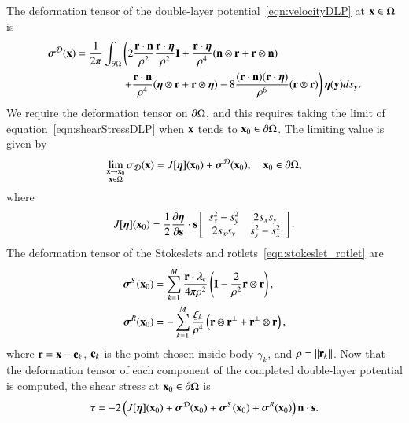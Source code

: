 \documentclass[preprint, 10pt]{elsarticle}
\begin{document}
The deformation tensor of the double-layer
potential~\eqref{eqn:velocityDLP} at ${\mathbf{x}} \in \Omega$ is
\begin{equation}
  \label{eqn:shearStressDLP}
  \begin{aligned}
  {\boldsymbol\sigma}^{\mathcal{D}}({\mathbf{x}}) = \frac{1}{2\pi}\int_{{\partial}\Omega} &\left(
    2\frac{{\mathbf{r}} \cdot {\mathbf{n}}}{\rho^2} \frac{{\mathbf{r}} \cdot {\boldsymbol\eta}}{\rho^2} {\mathbf{I}} + 
    \frac{{\mathbf{r}} \cdot {\boldsymbol\eta}}{\rho^4} ({\mathbf{n}} \otimes {\mathbf{r}} + {\mathbf{r}} \otimes {\mathbf{n}}) 
    \right. \\
    &\left.
    +\frac{{\mathbf{r}} \cdot {\mathbf{n}}}{\rho^4} ({\boldsymbol\eta} \otimes {\mathbf{r}} + {\mathbf{r}} \otimes {\boldsymbol\eta}) - 
    8\frac{({\mathbf{r}} \cdot {\mathbf{n}})({\mathbf{r}} \cdot {\boldsymbol\eta})}{\rho^6}({\mathbf{r}} \otimes {\mathbf{r}})
  \right) {\boldsymbol\eta}({\mathbf{y}}) ds_{\mathbf{y}}.
  \end{aligned}
\end{equation}
We require the deformation tensor on ${\partial}\Omega$, and this requires
taking the limit of equation~\eqref{eqn:shearStressDLP} when ${\mathbf{x}}$ tends
to ${\mathbf{x}}_0 \in {\partial}\Omega$.  The limiting value is given
by~\cite{qua-bir2014a}
\begin{align*}
  \lim_{\substack{{\mathbf{x}} \rightarrow {\mathbf{x}}_0 \\ {\mathbf{x}} \in \Omega}}\sigma_{\mathcal{D}}({\mathbf{x}}) =
  J[{\boldsymbol\eta}]({\mathbf{x}}_0) + {\boldsymbol\sigma}^{\mathcal{D}}({\mathbf{x}}_0), \quad {\mathbf{x}}_0 \in {\partial}\Omega,
\end{align*} 
where
\begin{align}
  J[{\boldsymbol\eta}]({\mathbf{x}}_0) = \frac{1}{2}\frac{\partial {\boldsymbol\eta}}{\partial {\mathbf{s}}} \cdot {\mathbf{s}}
  \left[ \begin{array}{cc}
    s_x^2 - s_y^2 & 2s_x s_y \\ 2s_x s_y & s_y^2 - s_x^2
  \end{array}\right].
  \label{eqn:shearStressJump}
\end{align}
The deformation tensor of the Stokeslets and
rotlets~\eqref{eqn:stokeslet_rotlet} are
\begin{equation}
  \label{eqn:shearStressSR}
  \begin{aligned}
  {\boldsymbol\sigma}^S({\mathbf{x}}_0) &= \sum_{k=1}^{M}
    \frac{{\mathbf{r}} \cdot {\boldsymbol\lambda}_k}{4\pi\rho^2} \left(
    {\mathbf{I}} - \frac{2}{\rho^2} {\mathbf{r}} \otimes {\mathbf{r}} \right),  \\
  {\boldsymbol\sigma}^R({\mathbf{x}}_0) &= -\sum_{k=1}^M
    \frac{\xi_k}{\rho^4} \left({\mathbf{r}} \otimes {\mathbf{r}}^\perp + 
    {\mathbf{r}}^\perp \otimes {\mathbf{r}} \right),
  \end{aligned}
\end{equation}
where ${\mathbf{r}} = {\mathbf{x}} - {\mathbf{c}}_k$, ${\mathbf{c}}_k$ is the point chosen inside body
$\gamma_k$, and $\rho = \|{\mathbf{r}}_k\|$.  Now that the deformation tensor of
each component of the completed double-layer potential is computed, the
shear stress at ${\mathbf{x}}_0 \in {\partial}\Omega$ is
\begin{align*}
  \tau = -2 \left(J[{\boldsymbol\eta}]({\mathbf{x}}_0) + {\boldsymbol\sigma}^{\mathcal{D}}({\mathbf{x}}_0) + 
    {\boldsymbol\sigma}^S({\mathbf{x}}_0) + {\boldsymbol\sigma}^R({\mathbf{x}}_0)\right) {\mathbf{n}} \cdot {\mathbf{s}}.
\end{align*}
\end{document}
